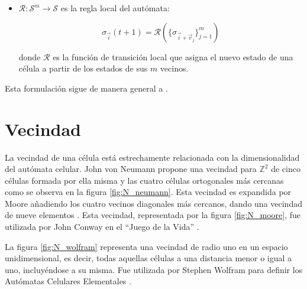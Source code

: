\begin{definition}
\begin{itemize}
		
		
		\item $\mathcal{R} : \mathcal{S}^m \to \mathcal{S}$ es la regla local del autómata:
		
		\[
		\sigma_{\vec{i}}(t + 1) = \mathcal{R} ( \{ \sigma_{\vec{i} + \vec{v}_j}\}_{j = 1}^m  )
		\]
		
		donde $\mathcal{R}$ es la función de transición local que asigna el nuevo estado de una célula a partir de los estados de sus $m$ vecinos.
		
		
		
	\end{itemize}
	
\end{definition}

Esta formulación sigue de manera general a \cite{ca_phd, sayama_cellularautomata, ca_discrete_universe}.

\section{Vecindad}

La vecindad de una célula está estrechamente relacionada con la dimensionalidad del autómata celular. John von Neumann propone una vecindad para $\mathbb{Z}^2$ de cinco células formada por ella misma y las cuatro células ortogonales más cercanas \cite{ca_theory_self_reproduction} como se observa en la figura \ref{fig:N_neumann}. Esta vecindad es expandida por Moore añadiendo los cuatro vecinos diagonales más cercanos, dando una vecindad de nueve elementos \cite{moore}. Esta vecindad, representada por la figura \ref{fig:N_moore}, fue utilizada por John Conway en el ``Juego de la Vida'' \cite{life}.

La figura \ref{fig:N_wolfram} representa una vecindad de radio uno en un espacio unidimensional, es decir, todas aquellas células a una distancia menor o igual a uno, incluyéndose a su misma. Fue utilizada por Stephen Wolfram para definir los Autómatas Celulares Elementales \cite{nks}.

